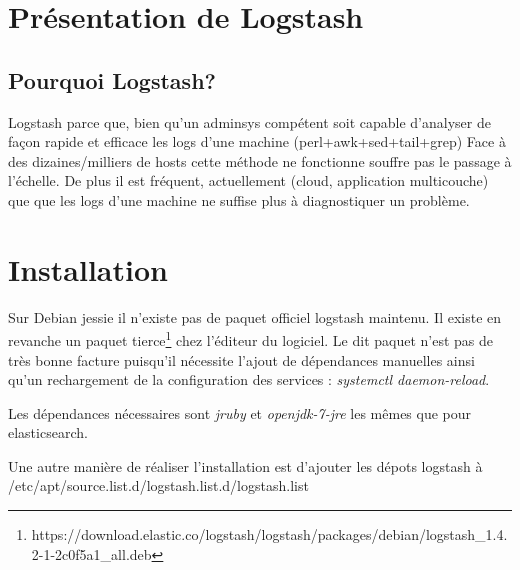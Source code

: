 \section{Présentation de Logstash}

\subsection{Pourquoi Logstash?}
Logstash parce que, bien qu'un adminsys compétent soit capable d'analyser
de façon rapide et efficace les logs d'une machine (perl+awk+sed+tail+grep)
Face à des dizaines/milliers de hosts cette méthode ne fonctionne souffre pas
le passage à l'échelle.
De plus il est fréquent, actuellement (cloud, application multicouche) que
que les logs d'une machine ne suffise plus à diagnostiquer un problème.

\section{Installation}
%
%
%
%
%
%
%
%
%
%
%
%




Sur Debian jessie il n'existe pas de paquet officiel logstash maintenu. Il existe 
en revanche un paquet tierce\footnote{https://download.elastic.co/logstash/logstash/packages/debian/logstash\_1.4.2-1-2c0f5a1\_all.deb} 
chez l'éditeur du logiciel. Le dit paquet n'est pas de très bonne facture  puisqu'il 
nécessite l'ajout de dépendances manuelles ainsi qu'un rechargement de la configuration 
des services : \emph{systemctl daemon-reload}.



Les dépendances nécessaires sont \emph{jruby} et \emph{openjdk-7-jre} les mêmes 
que pour elasticsearch.

Une autre manière de réaliser l'installation est d'ajouter les dépots logstash à 
/etc/apt/source.list.d/logstash.list.d/logstash.list

